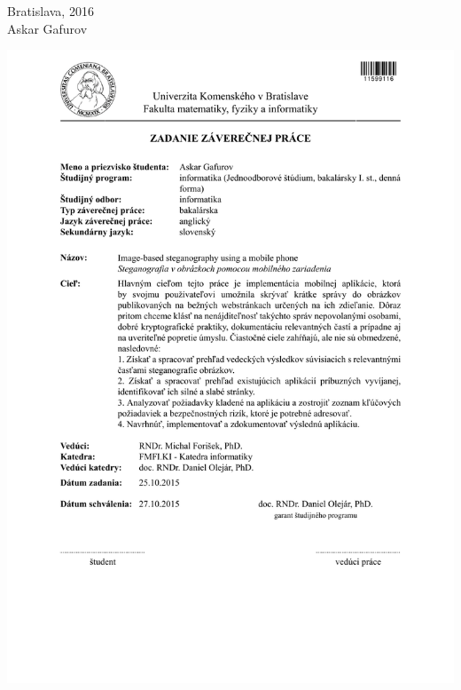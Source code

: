 \documentclass[12pt, oneside]{book}
\def\mfrok{2016}
\def\mfautor{Askar Gafurov}
\def\mfmiesto{Bratislava, \mfrok}
\begin{document}
\noindent \mfmiesto\\
\mfautor

\eject %





\newpage 
\thispagestyle{empty}
\hspace{-2cm}\includegraphics[width=1.1\textwidth]{images/zadanie_sk}
\end{document}
